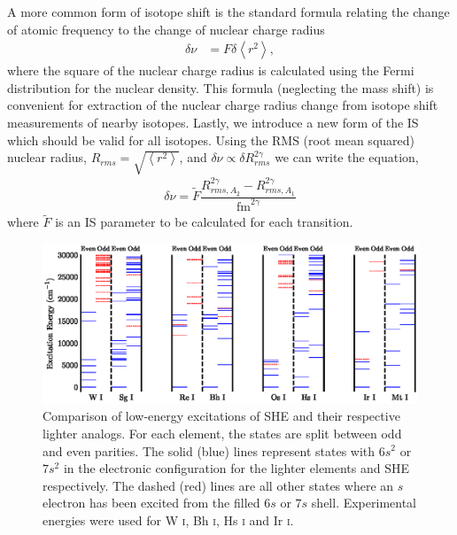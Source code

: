 \documentclass[10pt,a4paper, twoside, openright]{report}
\begin{document}
\linebreak
 A more common form of isotope shift is the standard formula relating the change of atomic frequency to the change of nuclear charge radius
\begin{align} \label{eq:isoF}
\delta \nu &= F\delta \left<r^{2}\right>,
\end{align}
where the square of the nuclear charge radius is calculated using the Fermi distribution for the nuclear density. This formula (neglecting the mass shift) is convenient for extraction of the nuclear charge radius change from isotope shift measurements of nearby isotopes. Lastly, we introduce a new form of the IS which should be valid for all isotopes. Using  the RMS (root mean squared) nuclear radius, $ R_{rms} = \sqrt{\left<r^{2}\right>}$,  and $\delta \nu \propto \delta R_{rms}^{2\gamma}$ \cite{FGV2018} we can write the equation,
\begin{align}\label{eq:isoFtilde}
\delta \nu = \tilde{F}\dfrac{R_{rms,A_2}^{2\gamma} - R_{rms,A_1}^{2\gamma}}{\text{fm}^{2\gamma}}
\end{align}
where $\tilde{F}$ is an IS parameter to be calculated for each transition.
\begin{landscape}
\begin{figure}
\centering
\includegraphics[scale=1]{./figures/Sg_Mt_Energy_Plot.eps} 
\caption[Low-energy excitation comparison between SHE and each respective lighter analog.]{Comparison of low-energy excitations of SHE and their respective lighter analogs. For each element, the states are split between odd and even parities. The solid (blue) lines represent states with $6s^2$ or $7s^2$ in the electronic configuration for the lighter elements and SHE respectively. The dashed (red) lines are all other states where an $s$ electron has been excited from the filled $6s$ or $7s$ shell. Experimental energies were used for W \textsc{i}, Bh \textsc{i}, Hs \textsc{i} and Ir \textsc{i}. \cite{NIST_ASD}\label{fig:EL}}
\end{figure}
\end{landscape}
\end{document}
